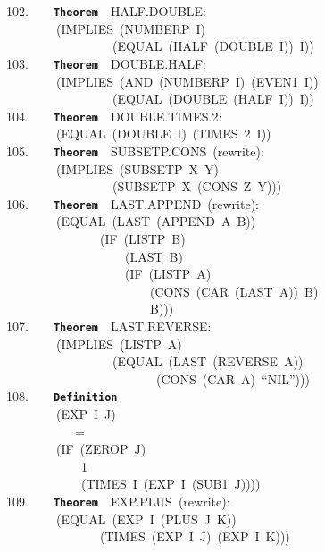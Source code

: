 \documentclass[11pt]{book}
\newenvironment{pubasis}{\begin{flushleft}\ttfamily\small}{\normalsize\rmfamily\end{flushleft}}
\newcommand{\axiomordefinition}[1]{\vspace{6pt}\texttt{\textbf{#1}}}
\begin{document}
\begin{pubasis}
102.~~~~\axiomordefinition{Theorem}~~HALF.DOUBLE:\\
~~~~~~~~(IMPLIES~(NUMBERP~I)\\
~~~~~~~~~~~~~~~~~(EQUAL~(HALF~(DOUBLE~I))~I))\\

103.~~~~\axiomordefinition{Theorem}~~DOUBLE.HALF:\\
~~~~~~~~(IMPLIES~(AND~(NUMBERP~I)~(EVEN1~I))\\
~~~~~~~~~~~~~~~~~(EQUAL~(DOUBLE~(HALF~I))~I))\\

104.~~~~\axiomordefinition{Theorem}~~DOUBLE.TIMES.2:\\
~~~~~~~~(EQUAL~(DOUBLE~I)~(TIMES~2~I))\\

105.~~~~\axiomordefinition{Theorem}~~SUBSETP.CONS~(rewrite):\\
~~~~~~~~(IMPLIES~(SUBSETP~X~Y)\\
~~~~~~~~~~~~~~~~~(SUBSETP~X~(CONS~Z~Y)))\\

106.~~~~\axiomordefinition{Theorem}~~LAST.APPEND~(rewrite):\\
~~~~~~~~(EQUAL~(LAST~(APPEND~A~B))\\
~~~~~~~~~~~~~~~(IF~(LISTP~B)\\
~~~~~~~~~~~~~~~~~~~(LAST~B)\\
~~~~~~~~~~~~~~~~~~~(IF~(LISTP~A)\\
~~~~~~~~~~~~~~~~~~~~~~~(CONS~(CAR~(LAST~A))~B)\\
~~~~~~~~~~~~~~~~~~~~~~~B)))\\

107.~~~~\axiomordefinition{Theorem}~~LAST.REVERSE:\\
~~~~~~~~(IMPLIES~(LISTP~A)\\
~~~~~~~~~~~~~~~~~(EQUAL~(LAST~(REVERSE~A))\\
~~~~~~~~~~~~~~~~~~~~~~~~(CONS~(CAR~A)~``NIL'')))\\

108.~~~~\axiomordefinition{Definition}\\
~~~~~~~~(EXP~I~J)\\
~~~~~~~~~~~=\\
~~~~~~~~(IF~(ZEROP~J)\\
~~~~~~~~~~~~1\\
~~~~~~~~~~~~(TIMES~I~(EXP~I~(SUB1~J))))\\

109.~~~~\axiomordefinition{Theorem}~~EXP.PLUS~(rewrite):\\
~~~~~~~~(EQUAL~(EXP~I~(PLUS~J~K))\\
~~~~~~~~~~~~~~~(TIMES~(EXP~I~J)~(EXP~I~K)))\\


\end{pubasis}
\end{document}
